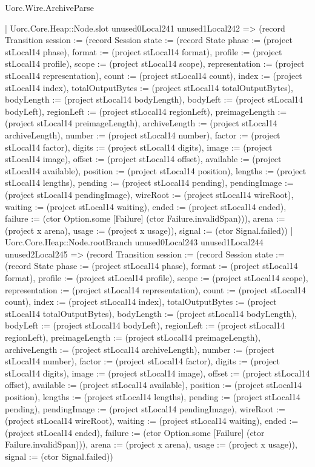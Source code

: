 \begin{lexlean}{Uorc.Wire.ArchiveParse}
\begin{semanticmodule}
{            | Uorc.Core.Heap::Node.slot unused0Local241 unused1Local242 => (record Transition {session := (record Session {state := (record State {phase := (project stLocal14 phase), format := (project stLocal14 format), profile := (project stLocal14 profile), scope := (project stLocal14 scope), representation := (project stLocal14 representation), count := (project stLocal14 count), index := (project stLocal14 index), totalOutputBytes := (project stLocal14 totalOutputBytes), bodyLength := (project stLocal14 bodyLength), bodyLeft := (project stLocal14 bodyLeft), regionLeft := (project stLocal14 regionLeft), preimageLength := (project stLocal14 preimageLength), archiveLength := (project stLocal14 archiveLength), number := (project stLocal14 number), factor := (project stLocal14 factor), digits := (project stLocal14 digits), image := (project stLocal14 image), offset := (project stLocal14 offset), available := (project stLocal14 available), position := (project stLocal14 position), lengths := (project stLocal14 lengths), pending := (project stLocal14 pending), pendingImage := (project stLocal14 pendingImage), wireRoot := (project stLocal14 wireRoot), waiting := (project stLocal14 waiting), ended := (project stLocal14 ended), failure := (ctor Option.some [Failure] (ctor Failure.invalidSpan))}), arena := (project x arena), usage := (project x usage)}), signal := (ctor Signal.failed)})
            | Uorc.Core.Heap::Node.rootBranch unused0Local243 unused1Local244 unused2Local245 => (record Transition {session := (record Session {state := (record State {phase := (project stLocal14 phase), format := (project stLocal14 format), profile := (project stLocal14 profile), scope := (project stLocal14 scope), representation := (project stLocal14 representation), count := (project stLocal14 count), index := (project stLocal14 index), totalOutputBytes := (project stLocal14 totalOutputBytes), bodyLength := (project stLocal14 bodyLength), bodyLeft := (project stLocal14 bodyLeft), regionLeft := (project stLocal14 regionLeft), preimageLength := (project stLocal14 preimageLength), archiveLength := (project stLocal14 archiveLength), number := (project stLocal14 number), factor := (project stLocal14 factor), digits := (project stLocal14 digits), image := (project stLocal14 image), offset := (project stLocal14 offset), available := (project stLocal14 available), position := (project stLocal14 position), lengths := (project stLocal14 lengths), pending := (project stLocal14 pending), pendingImage := (project stLocal14 pendingImage), wireRoot := (project stLocal14 wireRoot), waiting := (project stLocal14 waiting), ended := (project stLocal14 ended), failure := (ctor Option.some [Failure] (ctor Failure.invalidSpan))}), arena := (project x arena), usage := (project x usage)}), signal := (ctor Signal.failed)})
}
\end{semanticmodule}
\end{lexlean}
